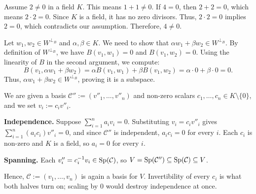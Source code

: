 \begin{exercisesolution}
\label{sol:two_nonzero_four_nonzero}
Assume $2 \neq 0$ in a field $K$. This means $1 + 1 \neq 0$. If $4 = 0$, then $2 + 2 = 0$, which means $2 \cdot 2 = 0$. Since $K$ is a field, it has no zero divisors. Thus, $2 \cdot 2 = 0$ implies $2 = 0$, which contradicts our assumption. Therefore, $4 \neq 0$.
\end{exercisesolution}

\begin{exercisesolution}
\label{sol:orthogonal_complement_wrt_B}
Let $w_1, w_2 \in W^{\perp_B}$ and $\alpha, \beta \in K$. We need to show that $\alpha w_1 + \beta w_2 \in W^{\perp_B}$. By definition of $W^{\perp_B}$, we have $B(v_1, w_1) = 0$ and $B(v_1, w_2) = 0$. Using the linearity of $B$ in the second argument, we compute:
\[
B(v_1, \alpha w_1 + \beta w_2) = \alpha B(v_1, w_1) + \beta B(v_1, w_2) = \alpha \cdot 0 + \beta \cdot 0 = 0.
\]
Thus, $\alpha w_1 + \beta w_2 \in W^{\perp_B}$, proving it is a subspace.
\end{exercisesolution}

\begin{exercisesolution}
\label{sol:scaled_family_is_basis}
We are given a basis $\mathcal{C}'' := (v''_1, \dots, v''_n)$ and non-zero scalars $c_1, \dots, c_n \in K \setminus \{0\}$, and we set $v_i := c_i v''_i$.

\textbf{Independence.} Suppose $\sum_{i=1}^n a_i v_i = 0$. Substituting $v_i = c_i v''_i$ gives $\sum_{i=1}^n (a_i c_i) v''_i = 0$, and since $\mathcal{C}''$ is independent, $a_i c_i = 0$ for every $i$. Each $c_i$ is non-zero and $K$ is a field, so $a_i = 0$ for every $i$.

\textbf{Spanning.} Each $v''_i = c_i^{-1} v_i \in \operatorname{Sp}(\mathcal{C})$, so $V = \operatorname{Sp}(\mathcal{C}'') \subseteq \operatorname{Sp}(\mathcal{C}) \subseteq V$.

Hence, $\mathcal{C} := (v_1, \dots, v_n)$ is again a basis for $V$. Invertibility of every $c_i$ is what both halves turn on; scaling by $0$ would destroy independence at once.
\end{exercisesolution}

